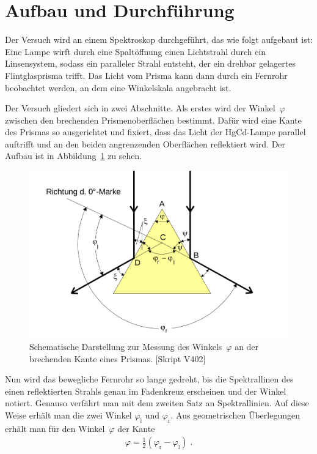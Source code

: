 \newpage
\section{Aufbau und Durchführung}\label{sec:aufbau-und-durchfuehrung}
Der Versuch wird an einem Spektroskop durchgeführt, das wie folgt aufgebaut ist: Eine Lampe wirft durch eine Spaltöffnung einen Lichtstrahl durch ein Linsensystem, sodass ein paralleler Strahl entsteht, der ein drehbar gelagertes Flintglasprisma trifft. Das Licht vom Prisma kann dann durch ein Fernrohr beobachtet werden, an dem eine Winkelskala angebracht ist.

Der Versuch gliedert sich in zwei Abschnitte. Als erstes wird der Winkel~$\varphi$ zwischen den brechenden Prismenoberflächen bestimmt.
Dafür wird eine Kante des Prismas so ausgerichtet und fixiert, dass das Licht der HgCd-Lampe parallel auftrifft und an den beiden angrenzenden Oberflächen reflektiert wird. Der Aufbau ist in Abbildung~\ref{fig:prism} zu sehen.

\begin{figure}
  \centering
  \includegraphics[width=0.4\textheight]{../figures/phi.png}
  \caption{Schematische Darstellung zur Messung des Winkels~$\varphi$ an der brechenden Kante eines Prismas. [Skript V402]}
\label{fig:prism}
\end{figure}

Nun wird das bewegliche Fernrohr so lange gedreht, bis die Spektrallinen des einen reflektierten Strahls genau im Fadenkreuz erscheinen und der Winkel notiert. Genauso verfährt man mit dem zweiten Satz an Spektrallinien. Auf diese Weise erhält man die zwei Winkel $\varphi_{\mathrm l}$ und $\varphi_{\mathrm r}$. Aus geometrischen Überlegungen erhält man für den Winkel~$\varphi$ der Kante
\begin{align}\label{equ:phi}
  \varphi = \frac{1}{2}(\varphi_{\mathrm r} - \varphi_{\mathrm l}) \; .
\end{align}

